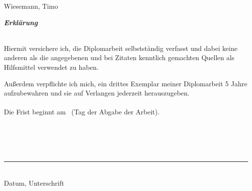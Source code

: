 \newpage
\thispagestyle{empty}
Wiesemann, Timo \\

\begin{center}
  \textit{\textbf{Erklärung}}
\end{center}

\hspace*{60mm}\\

Hiermit versichere ich, die Diplomarbeit selbstständig verfasst und dabei keine anderen als die angegebenen und bei Zitaten kenntlich gemachten Quellen als Hilfsmittel verwendet zu haben.
\bigskip

Außerdem verpflichte ich mich, ein drittes Exemplar meiner Diplomarbeit 5 Jahre aufzubewahren und sie auf Verlangen jederzeit herauszugeben.\\
\\
Die Frist beginnt am \hrulefill\ (Tag der Abgabe der Arbeit).\\
\\
\\
\\
\\
\begin{minipage}{25cm}
  \begin{flushright}
    \begin{center}
      \rule{7cm}{0.2mm}\\
      Datum, Unterschrift
      \end{center}
  \end{flushright}
\end{minipage}
